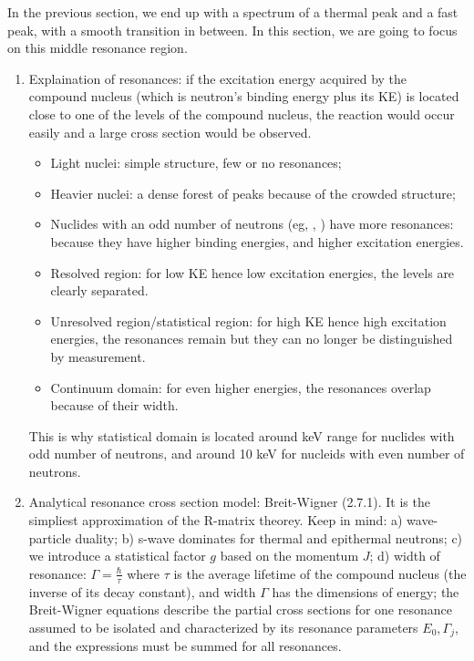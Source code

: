 \documentclass{school-22.211-notes}
\date{February 15, 2012}
\begin{document}
\maketitle

In the previous section, we end up with a spectrum of a thermal peak and a fast peak, with a smooth transition in between. In this section, we are going to focus on this middle resonance region. 

\begin{enumerate}
\item Explaination of resonances: if the excitation energy acquired by the compound nucleus (which is neutron's binding energy plus its KE) is located close to one of the levels of the compound nucleus, the reaction would occur easily and a large cross section would be observed. 
  \begin{itemize}
  \item Light nuclei: simple structure, few or no resonances;
  \item Heavier nuclei: a dense forest of peaks because of the crowded structure;
  \item Nuclides with an odd number of neutrons (eg, , ) have more resonances: because they have higher binding energies, and higher excitation energies.
  \item Resolved region: for low KE hence low excitation energies, the levels are clearly separated. 
  \item Unresolved region/statistical region: for high KE hence high excitation energies, the resonances remain but they can no longer be distinguished by measurement. 
  \item Continuum domain: for even higher energies, the resonances overlap because of their width. 
  \end{itemize}
  This is why statistical domain is located around keV range for nuclides with odd number of neutrons, and around 10 keV for nucleids with even number of neutrons. 
\item Analytical resonance cross section model: Breit-Wigner (2.7.1). It is the simpliest approximation of the R-matrix theorey. Keep in mind: a) wave-particle duality; b) s-wave dominates for thermal and epithermal neutrons; c) we introduce a statistical factor $g$ based on the momentum $J$; d) width of resonance: $\Gamma = \frac{\hbar}{\tau}$ where $\tau$ is the average lifetime of the compound nucleus (the inverse of its decay constant), and width $\Gamma$ has the dimensions of energy; the Breit-Wigner equations describe the partial cross sections for one resonance assumed to be isolated and characterized by its resonance parameters $E_0, \Gamma_j$, and the expressions must be summed for all resonances. 

\end{enumerate}
\end{document}
